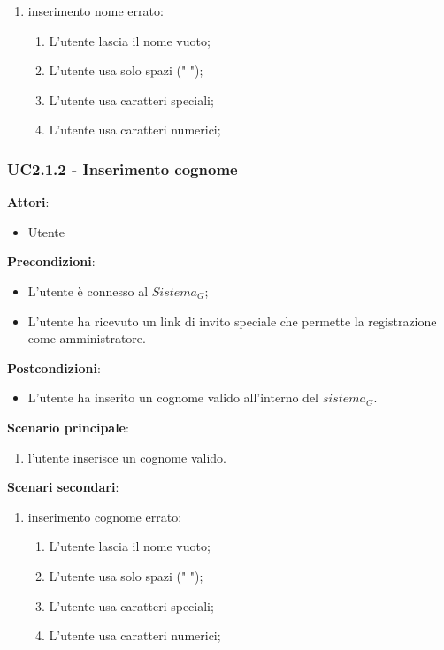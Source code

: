 \begin{enumerate}
    \item inserimento nome errato:
    \begin{enumerate}
        \item L'utente lascia il nome vuoto;
        \item L'utente usa solo spazi (" ");
        \item L'utente usa caratteri speciali;
        \item L'utente usa caratteri numerici;
    \end{enumerate}

\end{enumerate}


\subsubsection{UC2.1.2 - Inserimento cognome}\label{usecase:2_1_2}
\textbf{Attori}:
\begin{itemize}
    \item Utente
\end{itemize}
\textbf{Precondizioni}:
\begin{itemize}
    \item L'utente è connesso al $\textit{Sistema}_G$;
    \item L'utente ha ricevuto un link di invito speciale che permette la registrazione come amministratore.
\end{itemize}
\textbf{Postcondizioni}:
\begin{itemize}
    \item L'utente ha inserito un cognome valido all'interno del $\textit{sistema}_G$.
\end{itemize}
\textbf{Scenario principale}:
\begin{enumerate}
    \item l'utente inserisce un cognome valido.
\end{enumerate}
\textbf{Scenari secondari}:

\begin{enumerate}
    \item inserimento cognome errato:
    \begin{enumerate}
        \item L'utente lascia il nome vuoto;
        \item L'utente usa solo spazi (" ");
        \item L'utente usa caratteri speciali;
        \item L'utente usa caratteri numerici;
    \end{enumerate}    
\end{enumerate}

